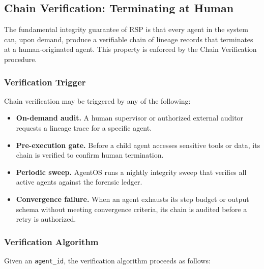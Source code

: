 \subsection{Chain Verification: Terminating at Human}
\label{subsection:chain-verification}

The fundamental integrity guarantee of RSP is that every agent in the system can, upon demand, produce a verifiable chain of lineage records that terminates at a human-originated agent. This property is enforced by the Chain Verification procedure.

\subsubsection{Verification Trigger}
\label{subsubsection:verification-trigger}

Chain verification may be triggered by any of the following:

\begin{itemize}
    \item \textbf{On-demand audit.} A human supervisor or authorized external auditor requests a lineage trace for a specific agent.
    \item \textbf{Pre-execution gate.} Before a child agent accesses sensitive tools or data, its chain is verified to confirm human termination.
    \item \textbf{Periodic sweep.} AgentOS runs a nightly integrity sweep that verifies all active agents against the forensic ledger.
    \item \textbf{Convergence failure.} When an agent exhausts its step budget or output schema without meeting convergence criteria, its chain is audited before a retry is authorized.
\end{itemize}

\subsubsection{Verification Algorithm}
\label{subsubsection:verification-algorithm}

Given an \texttt{agent\_id}, the verification algorithm proceeds as follows:

